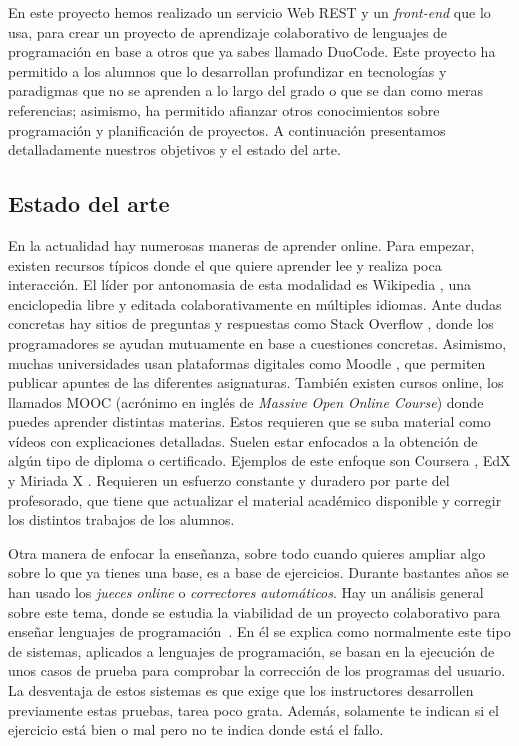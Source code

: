 
En este proyecto hemos realizado un servicio Web REST y un \emph{front-end} que lo usa, para crear un proyecto de aprendizaje colaborativo de lenguajes de programación en base a otros que ya sabes llamado DuoCode. Este proyecto ha permitido a los alumnos que lo desarrollan profundizar en tecnologías y paradigmas que no se aprenden a lo largo del grado o que se dan como meras referencias; asimismo, ha
permitido afianzar otros conocimientos sobre programación y planificación de proyectos.
A continuación presentamos detalladamente nuestros objetivos y el estado del arte.

\subsection{Estado del arte\label{subsec:introduction}}

En la actualidad hay numerosas maneras de aprender online. Para empezar, existen recursos típicos donde el que quiere aprender lee y realiza poca interacción. El líder por antonomasia de esta modalidad es Wikipedia \cite{wiki}, una enciclopedia libre y editada colaborativamente en múltiples idiomas. Ante dudas concretas hay sitios de preguntas y respuestas como Stack Overflow \cite{stack}, donde los programadores se ayudan mutuamente en base a cuestiones concretas. Asimismo, muchas universidades usan plataformas digitales como Moodle \cite{moodle}, que permiten publicar apuntes de las diferentes asignaturas. También existen cursos online, los llamados MOOC (acrónimo en inglés de \emph{Massive Open Online Course}) donde puedes aprender distintas materias. Estos requieren  que se suba material como vídeos con explicaciones detalladas. Suelen estar enfocados a la obtención de algún tipo de diploma o certificado. Ejemplos de este enfoque son Coursera \cite{coursera}, EdX \cite{edX} y Miriada X \cite{miriadaX}. Requieren un esfuerzo constante y duradero por parte del profesorado, que tiene que actualizar el material académico disponible y corregir los distintos trabajos de los alumnos. 

Otra manera de enfocar la enseñanza, sobre todo cuando quieres ampliar algo sobre lo que ya tienes una base, es a base de ejercicios. Durante bastantes años se han usado los \emph{jueces online} o \emph{correctores automáticos}. Hay un análisis general sobre este tema, donde se estudia la viabilidad de un proyecto colaborativo para enseñar lenguajes de programación~\cite{pimcdDuoCode14}. En él se explica como normalmente este tipo de sistemas, aplicados a lenguajes de programación, se basan en la ejecución de unos casos de prueba para comprobar la corrección de los programas del usuario. La desventaja de estos sistemas es que exige que los instructores desarrollen previamente estas pruebas, tarea poco grata. Además, solamente te indican si el ejercicio está bien o mal pero no te indica donde está el fallo.

